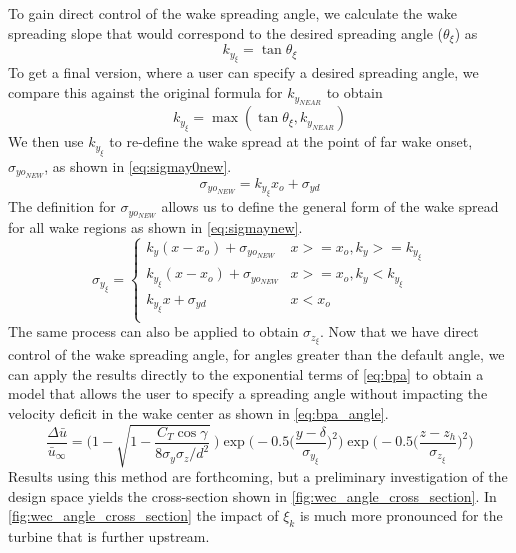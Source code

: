 \documentclass[a4paper]{jpconf}
\begin{document}
To gain direct control of the wake spreading angle, we calculate the wake spreading slope that would correspond to the desired spreading angle ($\theta_\xi$) as
%
\begin{equation}
k_{y_{\xi}} = \tan{\theta_\xi}
\end{equation}
%
To get a final version, where a user can specify a desired spreading angle, we compare this against the original formula for $k_{y_{NEAR}}$ to obtain
%
\begin{equation}
k_{y_{\xi}} = \max(\tan{\theta_\xi}, k_{y_{NEAR}})
\end{equation}
%
We then use $k_{y_{\xi}}$ to re-define the wake spread at the point of far wake onset, $\sigma_{yo_{NEW}}$, as shown in \cref{eq:sigmay0new}.
%
\begin{equation}\label{eq:sigmay0new}
\sigma_{yo_{NEW}} = k_{y_{\xi}}x_o+\sigma_{yd}
\end{equation}
%
The definition for $\sigma_{yo_{NEW}}$ allows us to define the general form of the wake spread for all wake regions as shown in \cref{eq:sigmaynew}. 
%
\begin{equation}\label{eq:sigmaynew}
\sigma_{y_{\xi}} =
\begin{cases} k_y (x-x_o)+\sigma_{yo_{NEW}} & x >= x_o, k_y >= k_{y_{\xi}} \\
k_{y_{\xi}} (x-x_o)+\sigma_{yo_{NEW}} & x >= x_o, k_y < k_{y_{\xi}} \\
k_{y_{\xi}}x+\sigma_{yd} & x < x_o \\
\end{cases}
\end{equation}
%
The same process can also be applied to obtain $\sigma_{z_{\xi}}$. Now that we have direct control of the wake spreading angle, for angles greater than the default angle, we can apply the results directly to the exponential terms of \cref{eq:bpa} to obtain  a model that allows the user to specify a spreading angle without impacting the velocity deficit in the wake center as shown in \cref{eq:bpa_angle}.
\begin{equation}
\frac{\Delta \bar{u}}{\bar{u}_{\infty}} = \Bigg(1-\sqrt{1-\frac{C_T \cos{\gamma}}{8 \sigma_y \sigma_z/d^2}}~\Bigg) \exp{\bigg(-0.5\Big(\frac{y-\delta}{\sigma_{y_{\xi}}}\Big)^2\bigg)}\exp{\bigg(-0.5\Big(\frac{z-z_h}{\sigma_{z_{\xi}}}\Big)^2\bigg)}
\label{eq:bpa_angle}
\end{equation}
%
Results using this method are forthcoming, but a preliminary investigation of the design space yields the cross-section shown in \cref{fig:wec_angle_cross_section}. In \cref{fig:wec_angle_cross_section} the impact of $\xi_k$ is much more pronounced for the turbine that is further upstream. 
\end{document}
